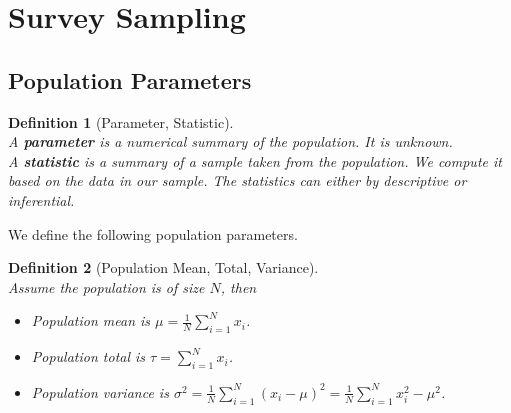 \documentclass[12pt]{article}
\newtheorem{definition}{Definition}[section]
\theoremstyle{definition}
\begin{document}
\section{Survey Sampling}
\subsection{Population Parameters}
\begin{definition}[Parameter, Statistic]
\hfill\\\normalfont A \textbf{parameter} is a numerical summary of the population. It is unknown.\\
A \textbf{statistic} is a summary of a sample taken from the population. We compute it based on the data in our sample. The statistics can either by descriptive or inferential.
\end{definition}
We define the following population parameters.
\begin{definition}[Population Mean, Total, Variance]
\hfill\\\normalfont Assume the population is of size $N$, then
\begin{itemize}
  \item Population mean is $\mu=\frac{1}{N}\sum_{i=1}^N x_i$.
  \item Population total is $\tau = \sum_{i=1}^N x_i$.
  \item Population variance is $\sigma^2 = \frac{1}{N}\sum_{i=1}^N (x_i-\mu)^2 = \frac{1}{N}\sum_{i=1}^N x_i^2 - \mu^2$.
\end{itemize}
\end{definition} 
\end{document}
